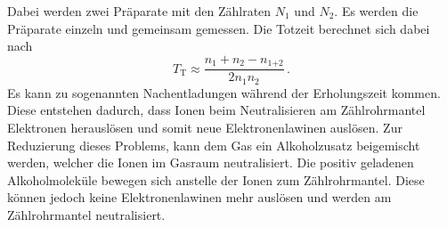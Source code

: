 Dabei werden zwei Präparate mit den Zählraten $N_1$ und $N_2$. Es werden die Präparate einzeln und gemeinsam gemessen.
Die Totzeit berechnet sich dabei nach
\begin{equation}
  T_\text{T} \approx \frac{n_1 +n_2 -n_\text{1+2}}{2n_1 n_2} \, .
  \label{eqn:totzeit}
\end{equation}
Es kann zu sogenannten Nachentladungen während der Erholungszeit kommen. Diese entstehen dadurch, dass Ionen beim Neutralisieren am Zählrohrmantel
Elektronen herauslösen und somit neue Elektronenlawinen auslösen. Zur Reduzierung dieses Problems, kann dem Gas ein Alkoholzusatz beigemischt werden, welcher die 
Ionen im Gasraum neutralisiert. Die positiv geladenen Alkoholmoleküle bewegen sich anstelle der Ionen zum Zählrohrmantel. Diese können jedoch keine Elektronenlawinen mehr auslösen und werden am Zählrohrmantel neutralisiert.
